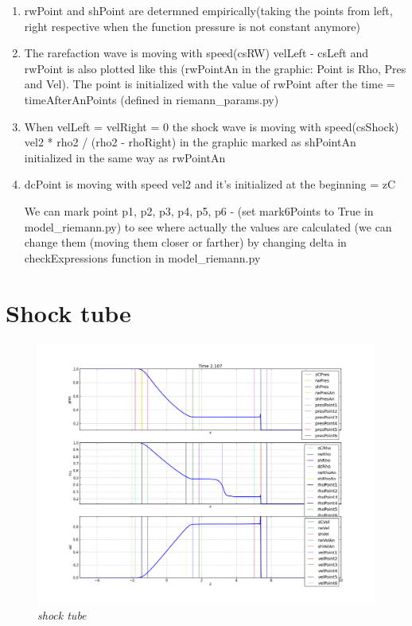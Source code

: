 \documentclass[12pt]{book}
\begin{document}
\begin{enumerate}
\item rwPoint and shPoint are determned empirically(taking the points from left, right respective when the function pressure is not constant anymore)
\item The rarefaction wave is moving  with speed(csRW) velLeft - csLeft and rwPoint is also plotted like this (rwPointAn in the graphic: Point is Rho, Pres and Vel). The point is initialized with the value of rwPoint after the time = timeAfterAnPoints (defined in riemann\_params.py)
\item When velLeft = velRight = 0 the shock wave is moving  with speed(csShock) vel2 * rho2 / (rho2 - rhoRight) in the graphic marked as shPointAn
initialized in the same way as rwPointAn 
\item dcPoint is moving with speed vel2 and it's initialized at the beginning = zC

We can mark point p1, p2, p3, p4, p5, p6 - (set mark6Points to True in model\_riemann.py) to see where actually the values are calculated
(we can change them (moving them closer or farther) by changing  delta  in checkExpressions function in model\_riemann.py

\end{enumerate}
\section*{Shock tube}

\begin{figure}[!h]
 \centering
 \includegraphics[scale=0.4]{shocktube.png}
	\caption{\emph{shock tube}}
 \label{Fig: 1}
\end{figure}
\end{document}
